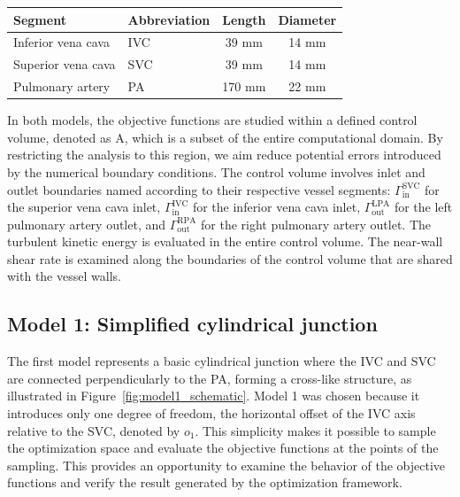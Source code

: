 \bgroup
\centering
\vspace{4mm}
\setlength\tabcolsep{3mm}
\def\arraystretch{1.7}%
\begin{tabular}{|l|l|c|c|}
	\hline
	Segment & Abbreviation & Length & Diameter \\ \hline
	Inferior vena cava 	& IVC 	&      39 mm        &     14 mm    \\ 
	Superior vena cava  & SVC 	&      39 mm     	&     14 mm     \\ 
	Pulmonary artery 	& PA 	&      170 mm     	&     22 mm     \\  \hline
\end{tabular}
\vspace{2mm}
\vspace{4mm}
\label{tab:tcpc dims}
\egroup

In both models, the objective functions are studied within a defined control volume, denoted as A, which is a subset of the entire computational domain. By restricting the analysis to this region, we aim reduce potential errors introduced by the numerical boundary conditions. The control volume involves inlet and outlet boundaries named according to their respective vessel segments: \(\Gamma^{\text{SVC}}_{\text{in}}\) for the superior vena cava inlet, \(\Gamma^{\text{IVC}}_{\text{in}}\) for the inferior vena cava inlet, \(\Gamma^{\text{LPA}}_{\text{out}}\) for the left pulmonary artery outlet, and \(\Gamma^{\text{RPA}}_{\text{out}}\) for the right pulmonary artery outlet. The turbulent kinetic energy is evaluated in the entire control volume. The near-wall shear rate is examined along the boundaries of the control volume that are shared with the vessel walls.

\subsection*{Model 1: Simplified cylindrical junction}\label{mod:model1}
The first model represents a basic cylindrical junction where the IVC and SVC are connected perpendicularly to the PA, forming a cross-like structure, as illustrated in Figure~\ref{fig:model1_schematic}. Model 1 was chosen because it introduces only one degree of freedom, the horizontal offset of the IVC axis relative to the SVC, denoted by $o_1$. This simplicity makes it possible to sample the optimization space and evaluate the objective functions at the points of the sampling. This provides an opportunity to examine the behavior of the objective functions and verify the result generated by the optimization framework.

